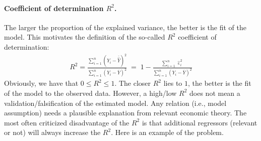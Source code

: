 \documentclass[
  14pt,
]{memoir}
\newenvironment{Shaded}{\begin{snugshade}}{\end{snugshade}}
\newcommand{\AttributeTok}[1]{\textcolor[rgb]{0.77,0.63,0.00}{#1}}
\newcommand{\CommentTok}[1]{\textcolor[rgb]{0.56,0.35,0.01}{\textit{#1}}}
\newcommand{\DecValTok}[1]{\textcolor[rgb]{0.00,0.00,0.81}{#1}}
\newcommand{\FunctionTok}[1]{\textcolor[rgb]{0.00,0.00,0.00}{#1}}
\newcommand{\NormalTok}[1]{#1}
\newcommand{\OtherTok}[1]{\textcolor[rgb]{0.56,0.35,0.01}{#1}}
\newcommand{\SpecialCharTok}[1]{\textcolor[rgb]{0.00,0.00,0.00}{#1}}
\DeclareMathOperator{\eps}{\varepsilon}
\begin{document}
\paragraph*{Coefficient of determination $R^2$.}

The larger the proportion of the explained variance, the better is the fit of the model. This motivates the definition of the so-called \(R^2\) coefficient of determination:
\begin{eqnarray*}
R^2=\frac{\sum_{i=1}^n\left(\hat{Y}_i-\bar{\hat{Y}}\right)^2}{\sum_{i=1}^n\left(Y_i-\bar{Y}\right)^2}\;=\;1-\frac{\sum_{i=1}^n\hat{\eps}_i^2}{\sum_{i=1}^n\left(Y_i-\bar{Y}\right)^2}
\end{eqnarray*}
Obviously, we have that \(0\leq R^2\leq 1\). The closer \(R^2\) lies to \(1\), the better is the fit of the model to the observed data. However, a high/low \(R^2\) does not mean a validation/falsification of the estimated model. Any relation (i.e., model assumption) needs a plausible explanation from relevant economic theory. The most often criticized disadvantage of the \(R^2\) is that additional regressors (relevant or not) will always increase the \(R^2\). Here is an example of the problem.

\begin{Shaded}
\end{Shaded}
\end{document}
